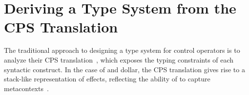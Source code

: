 \newcommand{\LambdahType}{
\begin{figure}

\lefttext{Syntax of Types and Effects}
\begin{align*}
A, B &::= \basety \mid \carrowty{A}{C} && \text{Value Types} \\
C &::= \cty{A}{\epsilon} && \text{Computation Types} \\
\epsilon &::= \pureeff \mid \effp{A}{B} && \text{Effects} \\
\end{align*}

\lefttext{Typing Rules}

\[
\typing{\judgev{\Gamma}{V}{A}}
       {\judgee{\Gamma}{\doop{V}}{B}{\effp{A}{B}}}
       {Do}
\qquad
\typing{\begin{trgather}
        \judgee{\Gamma}{M}{A}{\effp{\Apr}{\Bpr}} \\
        \judgec{\extenv{\Gamma}{x}{A}}{M_r}{C} \\
        \judgec{\extenvtwo{\Gamma}{x}{\Apr}{k}{\carrowty{\Bpr}{C}}}
               {M_h}{C}
        \end{trgather}}
       {\judgec{\Gamma}{\handle{M}{x}{M_r}{x}{k}{M_h}}{C}}
       {Handle}
\]

\caption{Type System of \lambdah
(rules for $\lambda$-terms are the same as Figure~\ref{fig:lambdasztype})}
\label{fig:lambdahtype}
\end{figure}
}

\newcommand{\TyEff}{
\begin{figure}

\begin{align*}
A, B &::= \basety \mid \carrowty{A}{C} && \text{Value Types} \\
C, D &::= \cty{A}{C} && \text{Computation Types} \\
\epsilon &::= \pureeff \mid \effc{A}{B}{C} && \text{Effects}
\end{align*}

\caption{Syntax of \lambdah Effects and Types}
\label{fig:tyeff}
\end{figure}
}

\section{Deriving a Type System from the CPS Translation}
\label{sec:type2}

The traditional approach to designing a type system for control operators
is to analyze their CPS translation~\cite{danvy-context}, which exposes
the typing constraints of each syntactic construct.
In the case of \shiftztt and dollar, the CPS translation gives rise to a
stack-like representation of effects, reflecting the ability of \shiftztt
to capture metacontexts~\cite{materzok-subtyping,materzok-hierarchy}.

